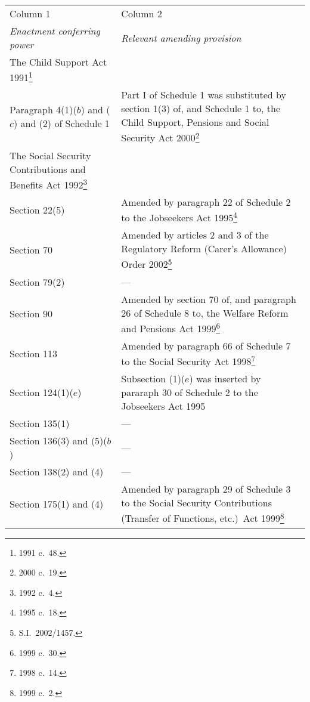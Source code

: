 \documentclass[12pt,a4paper]{article}
\begin{document}
{
\begin{longtable}{p{97.9536pt}p{268.04297pt}}
\hline
Column 1	&Column 2\\
\itshape Enactment conferring power	& \itshape Relevant amending provision\\
\hline
\endhead
\hline
\endlastfoot
The Child Support Act 1991\footnote{1991 c.\ 48.}	\\
\hspace{1em}Paragraph 4(1)($b$)  \hspace*{1em}and ($c$)  and (2) of \hspace*{1em}Schedule 1	&Part I of Schedule 1 was substituted by section 1(3) of, and Schedule 1 to, the Child Support, Pensions and Social Security Act 2000\footnote{2000 c.\ 19.}\\
The Social Security Contributions and Benefits Act 1992\footnote{1992 c.\ 4.}	\\
\hspace{1em}Section 22(5)	&Amended by paragraph 22 of Schedule 2 to the Jobseekers Act 1995\footnote{1995 c.\ 18.}\\
\hspace{1em}Section 70	&Amended by articles 2 and 3 of the Regulatory Reform (Carer’s Allowance) Order 2002\footnote{S.I.\ 2002/1457.}\\
\hspace{1em}Section 79(2)	&—\\
\hspace{1em}Section 90	&Amended by section 70 of, and paragraph 26 of Schedule 8 to, the Welfare Reform and Pensions Act 1999\footnote{1999 c.\ 30.}\\
\hspace{1em}Section 113	&Amended by paragraph 66 of Schedule 7 to the Social Security Act 1998\footnote{1998 c.\ 14.}\\
\hspace{1em}Section 124(1)($e$) 	&Subsection (1)($e$)  was inserted by pararaph 30 of Schedule 2 to the Jobseekers Act 1995\\
\hspace{1em}Section 135(1)	&—\\
\hspace{1em}Section 136(3) and \hspace*{1em}(5)($b$) 	&—\\
\hspace{1em}Section 138(2) and \hspace*{1em}(4)	&—\\
\hspace{1em}Section 175(1) and \hspace*{1em}(4)	&Amended by paragraph 29 of Schedule 3 to the Social Security Contributions (Transfer of Functions, etc.)\ Act 1999\footnote{1999 c.\ 2.}\\

\end{longtable}}
\end{document}
